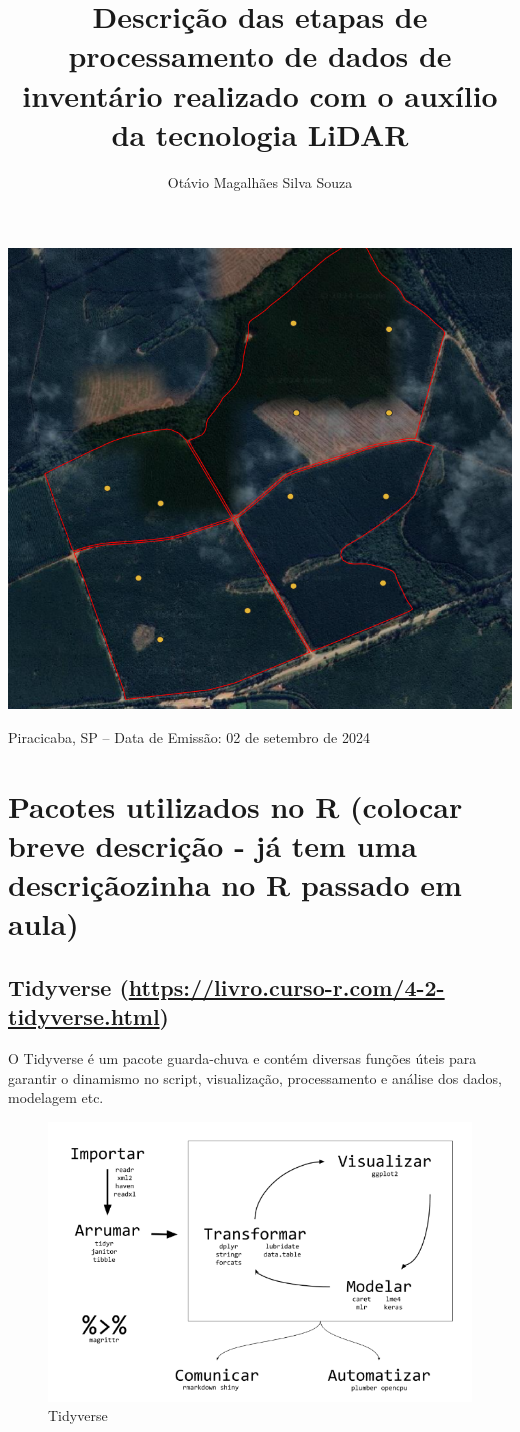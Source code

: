 \documentclass[
]{article}
\title{Descrição das etapas de processamento de dados de inventário
realizado com o auxílio da tecnologia LiDAR}
\author{Otávio Magalhães Silva Souza}
\date{}
\begin{document}
\maketitle

\begin{center}\includegraphics[width=0.4\linewidth]{IMAGES/CAPA} \end{center}

\centerline {Piracicaba, SP – Data de Emissão: 02 de setembro de 2024}
\newpage

\tableofcontents

\newpage

\section{Pacotes utilizados no R (colocar breve descrição - já tem uma
descriçãozinha no R passado em
aula)}\label{pacotes-utilizados-no-r-colocar-breve-descriuxe7uxe3o---juxe1-tem-uma-descriuxe7uxe3ozinha-no-r-passado-em-aula}

\subsection{\texorpdfstring{Tidyverse
(\url{https://livro.curso-r.com/4-2-tidyverse.html})}{Tidyverse (https://livro.curso-r.com/4-2-tidyverse.html)}}\label{tidyverse-httpslivro.curso-r.com4-2-tidyverse.html}

O Tidyverse é um pacote guarda-chuva e contém diversas funções úteis
para garantir o dinamismo no script, visualização, processamento e
análise dos dados, modelagem etc.

\begin{figure}

{\centering \includegraphics[width=0.6\linewidth]{IMAGES/tidyverse} 

}

\caption{Tidyverse}\label{fig:unnamed-chunk-2}
\end{figure}
\end{document}
